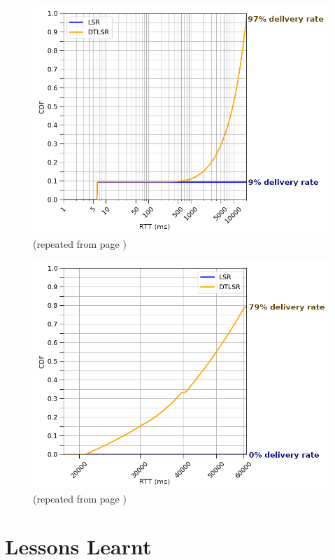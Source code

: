 \documentclass[withindex,glossary,openany]{cam-thesis}
\newcommand{\repeatcaption}[2]{%
  \renewcommand{\thefigure}{\ref{#1}}%
  \captionsetup{list=no}%
  \caption{#2 (repeated from page \pageref{#1})}%
  \addtocounter{figure}{-1}%
}
\begin{document}
\begin{minipage}{1\textwidth}

\begin{figure}[H]
  \centering
  \hspace*{2.4cm}
  \includegraphics[width=0.8\linewidth]{delay_partition_flap2_20}
  \repeatcaption{fig:partition_2_20}{}
\end{figure}

\begin{figure}[H]
  \centering
  \hspace*{2.4cm}
  \includegraphics[width=0.8\linewidth]{delay_full_partition_flap20}
  \repeatcaption{fig:full_partition_flap20}{}
\end{figure}



\end{minipage}


\section{Lessons Learnt}
\end{document}
